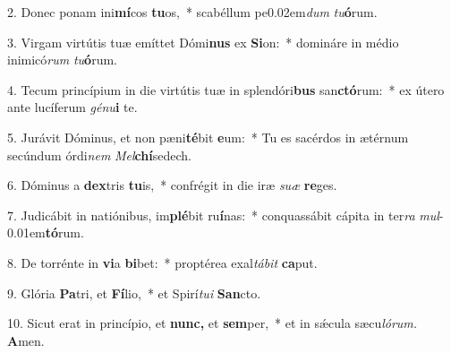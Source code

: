 \item 2. Donec ponam ini\textbf{mí}cos \textbf{tu}os,~* scabéllum pe\kern0.02em\textit{dum} \textit{tu}\textbf{ó}rum.
\item 3. Virgam virtútis tuæ emíttet Dómi\textbf{nus} ex \textbf{Si}on:~* domináre in médio inimicó\textit{rum} \textit{tu}\textbf{ó}rum.
\item 4. Tecum princípium in die virtútis tuæ in splendóri\textbf{bus} san\textbf{ctó}rum:~* ex útero ante lucíferum \textit{génu}\textbf{i} te.
\item 5. Jurávit Dóminus, et non pæni\textbf{té}bit \textbf{e}um:~* Tu es sacérdos in ætérnum secúndum órdi\textit{nem} \textit{Mel}\textbf{chí}sedech.
\item 6. Dóminus a \textbf{dex}tris \textbf{tu}is,~* confrégit in die iræ \textit{suæ} \textbf{re}ges.
\item 7. Judicábit in natiónibus, im\textbf{plé}bit ru\textbf{í}nas:~* conquassábit cápita in ter\textit{ra} \textit{mul}\kern-0.01em\textbf{tó}rum.
\item 8. De torrénte in \textbf{vi}a \textbf{bi}bet:~* proptérea exal\textit{tábit} \textbf{ca}put.
\item 9. Glória \textbf{Pa}tri, et \textbf{Fí}lio,~* et Spirí\hspace{0.03em}\textit{tu}\textit{i} \textbf{San}cto.
\item 10. Sicut erat in princípio, et \textbf{nunc,} et \textbf{sem}per,~* et in sǽcula sæcu\hspace{0.03em}\textit{lórum.} \textbf{A}men.